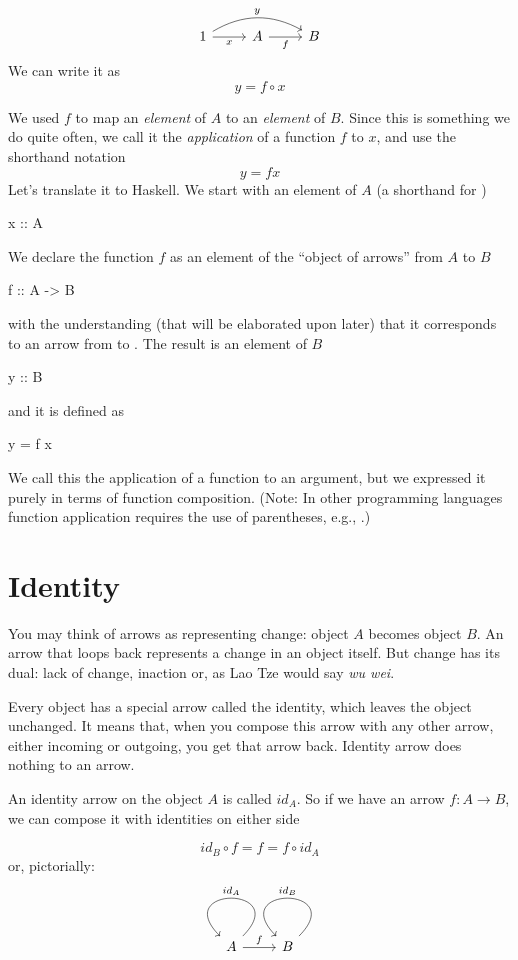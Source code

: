\documentclass[DaoFP]{subfiles}
\begin{document}
\[
 \begin{tikzcd}
 1
 \arrow[rr, bend left, "y"]
 \arrow[r, "x"']
 & A
 \arrow[r, "f"']
& B
 \end{tikzcd}
\]
We can write it as
\[y = f \circ x \]

We used $f$ to map an \emph{element} of $A$ to an \emph{element} of $B$. Since this is something we do quite often, we call it the \emph{application} of a function $f$ to $x$, and use the shorthand notation
\[y = f x \]
Let's translate it to Haskell. We start with an element of $A$ (a shorthand for )
\begin{haskell}
x :: A
\end{haskell}
We declare the function $f$ as an element of the ``object of arrows'' from $A$ to $B$
\begin{haskell}
f :: A -> B
\end{haskell}
with the understanding (that will be elaborated upon later) that it corresponds to an arrow from  to . The result is an element of $B$
\begin{haskell}
y :: B
\end{haskell}
and it is defined as
\begin{haskell}
y = f x
\end{haskell}
We call this the application of a function to an argument, but we expressed it purely in terms of function composition. (Note: In other programming languages function application requires the use of parentheses, e.g., .)

\section{Identity}

You may think of arrows as representing change: object $A$ becomes object $B$. An arrow that loops back represents a change in an object itself. But change has its dual: lack of change, inaction or, as Lao Tze would say \emph{wu wei}. 

Every object has a special arrow called the identity, which leaves the object unchanged. It means that, when you compose this arrow with any other arrow, either incoming or outgoing, you get that arrow back. Identity arrow does nothing to an arrow. 

An identity arrow on the object $A$ is called $id_A$. So if we have an arrow $f \colon A \to B$, we can compose it with identities on either side

\[id_B \circ f = f = f \circ id_A \]
or, pictorially:
\[
 \begin{tikzcd}
 A
 \arrow[loop, "id_A"']
 \arrow[r, "f"]
 & B
 \arrow[loop, "id_B"']
 \end{tikzcd}
\]
\end{document}
